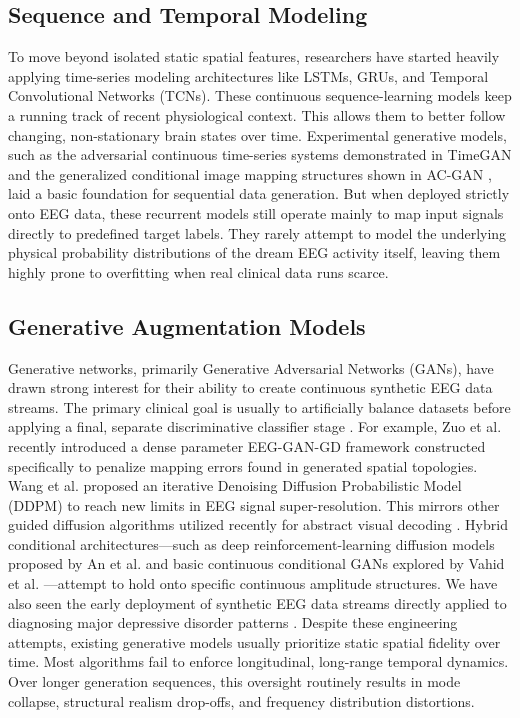 \documentclass[journal,10pt,twocolumn]{IEEEtran}
\begin{document}
\subsection{Sequence and Temporal Modeling}
To move beyond isolated static spatial features, researchers have started heavily applying time-series modeling architectures like LSTMs, GRUs, and Temporal Convolutional Networks (TCNs). These continuous sequence-learning models keep a running track of recent physiological context. This allows them to better follow changing, non-stationary brain states over time. Experimental generative models, such as the adversarial continuous time-series systems demonstrated in TimeGAN \cite{yoon2019time} and the generalized conditional image mapping structures shown in AC-GAN \cite{odena2017conditional}, laid a basic foundation for sequential data generation. But when deployed strictly onto EEG data, these recurrent models still operate mainly to map input signals directly to predefined target labels. They rarely attempt to model the underlying physical probability distributions of the dream EEG activity itself, leaving them highly prone to overfitting when real clinical data runs scarce.

\subsection{Generative Augmentation Models}
Generative networks, primarily Generative Adversarial Networks (GANs), have drawn strong interest for their ability to create continuous synthetic EEG data streams. The primary clinical goal is usually to artificially balance datasets before applying a final, separate discriminative classifier stage \cite{8852227, hartmann2018eeggan}. For example, Zuo et al. \cite{zuo2025high} recently introduced a dense parameter EEG-GAN-GD framework constructed specifically to penalize mapping errors found in generated spatial topologies. Wang et al. \cite{10839074} proposed an iterative Denoising Diffusion Probabilistic Model (DDPM) to reach new limits in EEG signal super-resolution. This mirrors other guided diffusion algorithms utilized recently for abstract visual decoding \cite{li2024visualdecodingreconstructioneeg, 11154007}. Hybrid conditional architectures—such as deep reinforcement-learning diffusion models proposed by An et al. \cite{an2024enhancingeegsignalgeneration} and basic continuous conditional GANs explored by Vahid et al. \cite{vahid2022conditional}—attempt to hold onto specific continuous amplitude structures. We have also seen the early deployment of synthetic EEG data streams directly applied to diagnosing major depressive disorder patterns \cite{10.3389/fnins.2023.1219133}. Despite these engineering attempts, existing generative models usually prioritize static spatial fidelity over time. Most algorithms fail to enforce longitudinal, long-range temporal dynamics. Over longer generation sequences, this oversight routinely results in mode collapse, structural realism drop-offs, and frequency distribution distortions.
\end{document}

